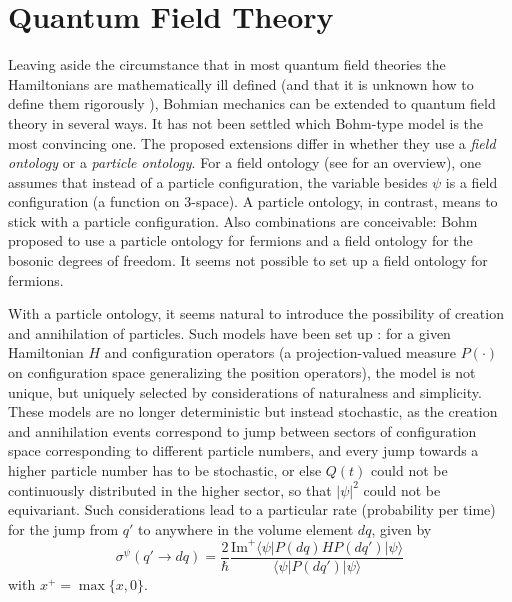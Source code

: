 \documentclass[12pt]{article}
\newcommand{\be}{\begin{equation}}
\newcommand{\ee}{\end{equation}}
\renewcommand{\Im}{\mathrm{Im}}
\newcommand{\scp}[2]{\langle #1|#2 \rangle}
\begin{document}
\section{Quantum Field Theory}

Leaving aside the circumstance that in most quantum field theories the Hamiltonians are mathematically ill defined (and that it is unknown how to define them rigorously \cite{Wallace}), Bohmian mechanics can be extended to quantum field theory in several ways. It has not been settled which Bohm-type model is the most convincing one. The proposed extensions differ in whether they use a \emph{field ontology} or a \emph{particle ontology}. For a field ontology (see \cite{Str07} for an overview), one assumes that instead of a particle configuration, the variable besides $\psi$ is a field configuration (a function on 3-space). A particle ontology, in contrast, means to stick with a particle configuration. Also combinations are conceivable: Bohm \cite{Bohm52} proposed to use a particle ontology for fermions and a field ontology for the bosonic degrees of freedom. It seems not possible to set up a field ontology for fermions. 

With a particle ontology, it seems natural to introduce the possibility of creation and annihilation of particles. Such models have been set up \cite{Bell86,crlet}: for a given Hamiltonian $H$ and configuration operators (a projection-valued measure $P(\cdot)$ on configuration space generalizing the position operators), the model is not unique, but uniquely selected by considerations of naturalness and simplicity. These models are no longer deterministic but instead stochastic, as the creation and annihilation events correspond to jump between sectors of configuration space corresponding to different particle numbers, and every jump towards a higher particle number has to be stochastic, or else $Q(t)$ could not be continuously distributed in the higher sector, so that $|\psi|^2$ could not be equivariant. Such considerations lead to a particular rate (probability per time) for the jump from $q'$ to anywhere in the volume element $dq$, given by \cite{crlet}
\be\label{jumprate}
\sigma^\psi(q'\to dq) = \frac{2}{\hbar} \frac{\Im^+\scp{\psi}{P(dq)HP(dq')|\psi}}{\scp{\psi}{P(dq')|\psi}}
\ee
with $x^+=\max\{x,0\}$. 
\end{document}
